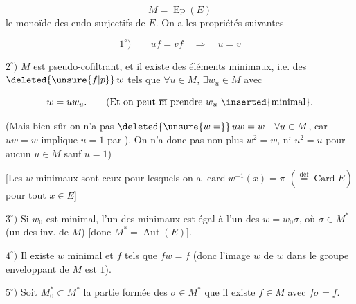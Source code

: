 \[
 M=\operatorname{Ep}(E)
\]
le monoïde des endo surjectifs de $E$. On a les propriétés suivantes

\[
 1^\circ)\qquad uf=vf\quad\Longrightarrow\quad u=v
\]

$2^\circ)$ $M$ est pseudo-cofiltrant, et  il existe des éléments minimaux, i.e. des $\deleted{\unsure{f|p}}\,w$ tels que $\forall u\in M$, $\exists w_u\in M$ avec

\[
 w=uw_u.\qquad \text{(Et on peut $\overline{\mathrm m}$ prendre $w_u$ \inserted{minimal}.}
\]

(Mais bien sûr on n'a pas $\deleted{\unsure{w=}}\,uw=w\quad\forall u\in M$, car $uw=w$ implique $u=1$ par ). On n'a donc pas non plus $w^2=w$, ni $u^2=u$ pour aucun $u\in M$ sauf $u=1$)

[Les $w$ minimaux sont ceux pour lesquels on a $\operatorname{card}w^{-1}(x)=\pi$ $(\overset{\mathrm{déf}}{=}\operatorname{Card} E)$ pour tout $x\in E$]

$3^\circ)$ Si $w_0$ est minimal, l'un des  minimaux est égal à l'un des $w=w_0\sigma$, où $\sigma\in M^*$ (un des  inv. de $M$) [donc $M^*=\operatorname{Aut}(E)$].

$4^\circ)$ Il existe $w$ minimal et $f$  tels que $fw=f$ (donc l'image $\bar w$ de $w$ dans le groupe enveloppant  de $M$ est $1$).

$5^\circ)$ Soit $M_0^*\subset M^*$  la partie formée des $\sigma\in M^*$  que il existe $f\in M$ avec $f\sigma=f$.

